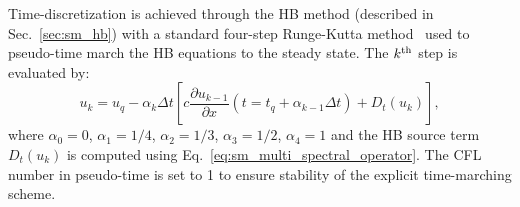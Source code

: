 Time-discretization is achieved 
through the HB method (described in Sec.~\ref{sec:sm_hb})
with a standard four-step Runge-Kutta method~\cite{Jameson1981}
used to pseudo-time 
march the HB equations to the steady state.
The $k\textsuperscript{th}$ step is evaluated by:
\begin{equation}
    u_k = u_q - \alpha_k \Delta t \left [ 
          c \frac{\partial u_{k-1}}{\partial x} (t=t_q + \alpha_{k-1} \Delta t)
          + D_t(u_k)
          \right],
    \label{eq:convection_rk4}
\end{equation}
where $\alpha_0 = 0$, $\alpha_1 = 1/4$, 
$\alpha_2 = 1/3$, $\alpha_3 = 1/2$, $\alpha_4 = 1$ and 
the HB source term $D_t(u_k)$ is computed using Eq.~\eqref{eq:sm_multi_spectral_operator}.
The CFL number in pseudo-time is set to 1 
to ensure stability of the explicit time-marching scheme.
